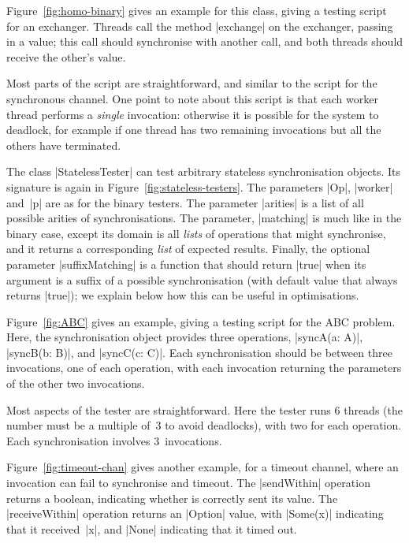 
Figure~\ref{fig:homo-binary} gives an example for this class, giving a testing
script for an exchanger.  Threads call the method |exchange| on the exchanger,
passing in a value; this call should synchronise with another call, and both
threads should receive the other's value.  

Most parts of the script are straightforward, and similar to the script for
the synchronous channel.  One point to note about this script is that each
worker thread performs a \emph{single} invocation: otherwise it is possible
for the system to deadlock, for example if one thread has two remaining
invocations but all the others have terminated.
 

The class |StatelessTester| can test arbitrary stateless synchronisation
objects.  Its signature is again in Figure~\ref{fig:stateless-testers}.
The parameters |Op|, |worker| and~|p| are as for the binary testers.  The
parameter |arities| is a list of all possible arities of synchronisations.
The parameter, |matching| is much like in the binary case, except its domain
is all \emph{lists} of operations that might synchronise, and it returns a
corresponding \emph{list} of expected results.  Finally, the optional
parameter |suffixMatching| is a function that should return |true| when its
argument is a suffix of a possible synchronisation (with default value that
always returns |true|); we explain below how this can be useful in
optimisations.


Figure~\ref{fig:ABC} gives an example, giving a testing script for the ABC
problem.  Here, the synchronisation object provides three operations,
|syncA(a: A)|, |syncB(b: B)|, and |syncC(c: C)|.  Each synchronisation should
be between three invocations, one of each operation, with each invocation
returning the parameters of the other two invocations.

Most aspects of the tester are straightforward.  Here the tester runs 6
threads (the number must be a multiple of~3 to avoid deadlocks), with two for
each operation.  Each synchronisation involves 3~invocations.


Figure~\ref{fig:timeout-chan} gives another example, for a timeout channel,
where an invocation can fail to synchronise and timeout.  The |sendWithin|
operation returns a boolean, indicating whether is correctly sent its value.
The |receiveWithin| operation returns an |Option| value, with |Some(x)|
indicating that it received~|x|, and |None| indicating that it timed out.

